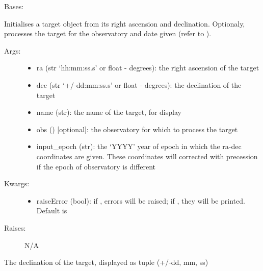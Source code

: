 \documentclass[letterpaper,10pt,english]{sphinxmanual}
\begin{document}
\begin{fulllineitems}
\label{astroobs:astroobs.Target.Target}
Bases: 

Initialises a target object from its right ascension and declination. Optionaly, processes the target for the observatory and date given (refer to ).
\begin{description}
\item[{Args:}] \leavevmode\begin{itemize}
\item {} 
ra (str `hh:mm:ss.s' or float - degrees): the right ascension of the target

\item {} 
dec (str `+/-dd:mm:ss.s' or float - degrees): the declination of the target

\item {} 
name (str): the name of the target, for display

\item {} 
obs () {[}optional{]}: the observatory for which to process the target

\item {} 
input\_epoch (str): the `YYYY' year of epoch in which the ra-dec coordinates are given. These coordinates will corrected with precession if the epoch of observatory is different

\end{itemize}

\item[{Kwargs:}] \leavevmode\begin{itemize}
\item {} 
raiseError (bool): if , errors will be raised; if , they will be printed. Default is 

\end{itemize}

\item[{Raises:}] \leavevmode
N/A

\end{description}

\begin{fulllineitems}
\label{astroobs:astroobs.Target.Target.dec}
The declination of the target, displayed as tuple (+/-dd, mm, ss)


\end{fulllineitems}
\end{fulllineitems}
\end{document}
